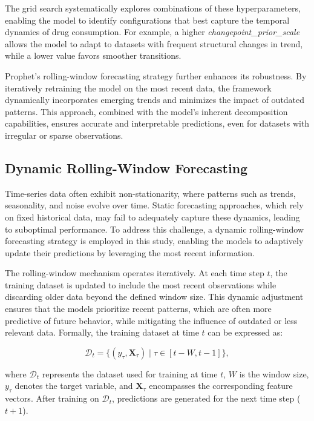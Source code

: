 \documentclass[journal]{IEEEtran}
\begin{document}
The grid search systematically explores combinations of these hyperparameters, enabling the model to identify configurations that best capture the temporal dynamics of drug consumption. For example, a higher \textit{changepoint\_prior\_scale} allows the model to adapt to datasets with frequent structural changes in trend, while a lower value favors smoother transitions.

Prophet’s rolling-window forecasting strategy further enhances its robustness. By iteratively retraining the model on the most recent data, the framework dynamically incorporates emerging trends and minimizes the impact of outdated patterns. This approach, combined with the model's inherent decomposition capabilities, ensures accurate and interpretable predictions, even for datasets with irregular or sparse observations.

\subsection{Dynamic Rolling-Window Forecasting}

Time-series data often exhibit non-stationarity, where patterns such as trends, seasonality, and noise evolve over time. Static forecasting approaches, which rely on fixed historical data, may fail to adequately capture these dynamics, leading to suboptimal performance. To address this challenge, a dynamic rolling-window forecasting strategy is employed in this study, enabling the models to adaptively update their predictions by leveraging the most recent information.

The rolling-window mechanism operates iteratively. At each time step \(t\), the training dataset is updated to include the most recent observations while discarding older data beyond the defined window size. This dynamic adjustment ensures that the models prioritize recent patterns, which are often more predictive of future behavior, while mitigating the influence of outdated or less relevant data. Formally, the training dataset at time \(t\) can be expressed as:

\[
\mathcal{D}_{t} = \{(y_{\tau}, \mathbf{X}_{\tau}) \mid \tau \in [t - W, t-1]\},
\]

where \(\mathcal{D}_{t}\) represents the dataset used for training at time \(t\), \(W\) is the window size, \(y_{\tau}\) denotes the target variable, and \(\mathbf{X}_{\tau}\) encompasses the corresponding feature vectors. After training on \(\mathcal{D}_{t}\), predictions are generated for the next time step (\(t+1\)).
\end{document}
